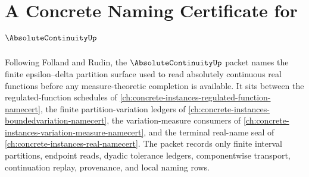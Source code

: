\chapter{A Concrete Naming Certificate for $\AbsoluteContinuityUp$}
\label{ch:concrete-instances-absolute-continuity-namecert}

Following Folland and Rudin, the $\AbsoluteContinuityUp$ packet names the finite epsilon--delta partition surface used to read absolutely continuous real functions before any measure-theoretic completion is available. It sits between the regulated-function schedules of \autoref{ch:concrete-instances-regulated-function-namecert}, the finite partition-variation ledgers of \autoref{ch:concrete-instances-boundedvariation-namecert}, the variation-measure consumers of \autoref{ch:concrete-instances-variation-measure-namecert}, and the terminal real-name seal of \autoref{ch:concrete-instances-real-namecert}. The packet records only finite interval partitions, endpoint reads, dyadic tolerance ledgers, componentwise transport, continuation replay, provenance, and local naming rows.

